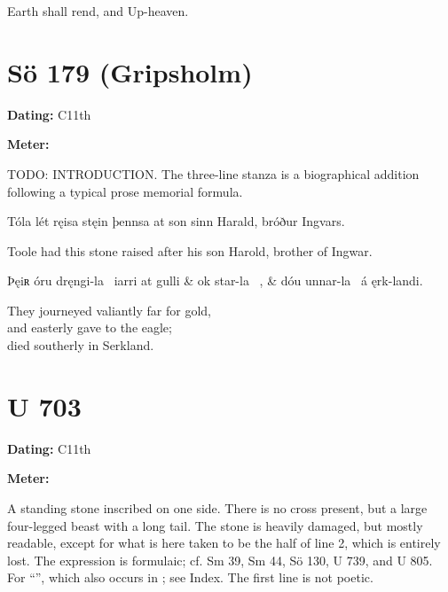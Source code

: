\bvb Earth shall rend, and Up-heaven.\evb\evg

\sectionline

\section{Sö 179 (Gripsholm)}

\begin{flushright}%
\textbf{Dating:} C11th

\textbf{Meter:} \Fornyrdislag
\end{flushright}%

TODO: INTRODUCTION.  The three-line stanza is a biographical addition following a typical prose memorial formula.

\bpg\bpa[0]Tóla lét ręisa stęin þennsa at son sinn Harald, bróður Ingvars.\epa

\bpb Toole had this stone raised after his son Harold, brother of Ingwar.\epb\epg

\bvg\bva[]%
Þęiʀ óru dręngi-la \hld\ iarri at gulli &
ok star-la \hld\ , &
dóu unnar-la \hld\ á ęrk-landi.\eva

\bvb They journeyed valiantly far for gold, \\
and easterly gave to the eagle; \\
died southerly in Serkland.\evb\evg

\sectionline

\section{U 703}

\begin{flushright}%
\textbf{Dating:} C11th

\textbf{Meter:} \Fornyrdislag
\end{flushright}%

A standing stone inscribed on one side.  There is no cross present, but a large four-legged beast with a long tail.  The stone is heavily damaged, but mostly readable, except for what is here taken to be the half of line 2, which is entirely lost.  The expression is formulaic; cf. Sm 39, Sm 44, Sö 130, U 739, and U 805.  For “”, which also occurs in \Havamal; see Index.  The first line is not poetic.

